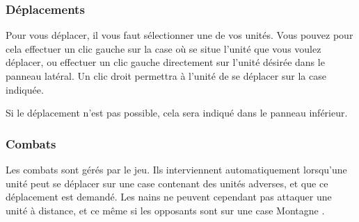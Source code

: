 \documentclass[a4paper]{article}
\begin{document}
		\subsubsection{Déplacements}
		Pour vous déplacer, il vous faut sélectionner une de vos unités. Vous pouvez pour cela effectuer un clic gauche sur la case où se situe l'unité que vous voulez déplacer, ou effectuer un clic gauche directement sur l'unité désirée dans le panneau latéral.
		Un clic droit permettra à l'unité de se déplacer sur la case indiquée.

		Si le déplacement n'est pas possible, cela sera indiqué dans le panneau inférieur.

		\subsubsection{Combats}
		Les combats sont gérés par le jeu. Ils interviennent automatiquement lorsqu'une unité peut se déplacer sur une case contenant des unités adverses, et que ce déplacement est demandé. Les nains ne peuvent cependant pas attaquer une unité à distance, et ce même si les opposants sont sur une case \og Montagne \fg{}.
\end{document}
